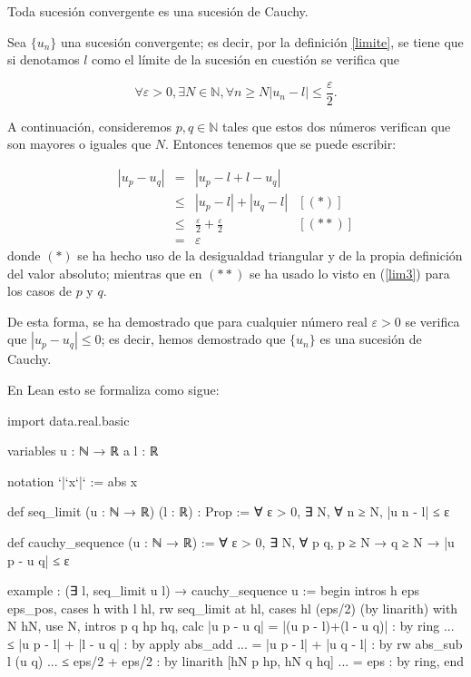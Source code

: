 \begin{teorema}
  Toda sucesión convergente es una sucesión de Cauchy.
\end{teorema}
\begin{demostracion}
  Sea \(\{u_n\}\) una sucesión convergente; es decir, por la definición
  \ref{limite}, se tiene que si denotamos \(l\) como el límite de la
  sucesión en cuestión se verifica que

  \begin{equation}\label{lim3}
  ∀ ε > 0, ∃ N ∈ ℕ, ∀ n ≥ N |u_n-l| ≤ \frac{ε}{2}.
  \end{equation}

  A continuación, consideremos \(p,q ∈ ℕ\) tales que estos dos números
  verifican que son mayores o iguales que \(N\). Entonces tenemos que se
  puede escribir:

  \[\begin{array}{llll}
      |u_p-u_q| &= &|u_p-l+l-u_q|           & \\
                &≤ &|u_p-l|+|u_q-l|         & [(*)] \\
                &≤ &\frac{ε}{2}+\frac{ε}{2} & [(**)] \\
                &= &ε
  \end{array}\]
  donde \((*)\) se ha hecho uso de la desigualdad triangular y de la
  propia definición del valor absoluto; mientras que en \((**)\) se ha
  usado lo visto en (\ref{lim3}) para los casos de \(p\) y \(q\).

  De esta forma, se ha demostrado que para cualquier número real \(ε > 0\)
  se verifica que \(|u_p - u_q| ≤ 0\); es decir, hemos demostrado
  que \(\{u_n\}\) es una sucesión de Cauchy.
\end{demostracion}

En Lean esto se formaliza como sigue:
\begin{leancode}
import data.real.basic

variables {u : ℕ → ℝ} {a l : ℝ}

notation `|`x`|` := abs x

def seq_limit (u : ℕ → ℝ) (l : ℝ) : Prop :=
∀ ε > 0, ∃ N, ∀ n ≥ N, |u n - l| ≤ ε

def cauchy_sequence (u : ℕ → ℝ) :=
∀ ε > 0, ∃ N, ∀ p q, p ≥ N → q ≥ N → |u p - u q| ≤ ε

example : (∃ l, seq_limit u l) → cauchy_sequence u :=
begin
  intros h eps eps_pos,
  cases h with l hl,
  rw seq_limit at hl,
  cases hl (eps/2) (by linarith) with N hN,
  use N,
    intros p q hp hq,
  calc  |u p - u q|
      = |(u p - l)+(l - u q)|  : by ring
  ... ≤ |u p - l| + |l - u q|  : by apply abs_add
  ... = |u p - l| + |u q - l|  : by rw abs_sub l (u q)
  ... ≤ eps/2 + eps/2          : by linarith [hN p hp, hN q hq]
  ... = eps                    : by ring,
end
\end{leancode}

